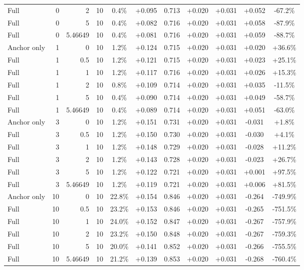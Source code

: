 \begin{table}[htbp]
\begin{tabular}{lrrrccccccc}
Full & 0 & 2 & 10 & 0.4\% & +0.095 & 0.713 & +0.020 & +0.031 & +0.052 & -67.2\% \\
Full & 0 & 5 & 10 & 0.4\% & +0.082 & 0.716 & +0.020 & +0.031 & +0.058 & -87.9\% \\
Full & 0 & 5.46649 & 10 & 0.4\% & +0.081 & 0.716 & +0.020 & +0.031 & +0.059 & -88.7\% \\
Anchor only & 1 & 0 & 10 & 1.2\% & +0.124 & 0.715 & +0.020 & +0.031 & +0.020 & +36.6\% \\
Full & 1 & 0.5 & 10 & 1.2\% & +0.121 & 0.715 & +0.020 & +0.031 & +0.023 & +25.1\% \\
Full & 1 & 1 & 10 & 1.2\% & +0.117 & 0.716 & +0.020 & +0.031 & +0.026 & +15.3\% \\
Full & 1 & 2 & 10 & 0.8\% & +0.109 & 0.714 & +0.020 & +0.031 & +0.035 & -11.5\% \\
Full & 1 & 5 & 10 & 0.4\% & +0.090 & 0.714 & +0.020 & +0.031 & +0.049 & -58.7\% \\
Full & 1 & 5.46649 & 10 & 0.4\% & +0.089 & 0.714 & +0.020 & +0.031 & +0.051 & -63.0\% \\
Anchor only & 3 & 0 & 10 & 1.2\% & +0.151 & 0.731 & +0.020 & +0.031 & -0.031 & +1.8\% \\
Full & 3 & 0.5 & 10 & 1.2\% & +0.150 & 0.730 & +0.020 & +0.031 & -0.030 & +4.1\% \\
Full & 3 & 1 & 10 & 1.2\% & +0.148 & 0.729 & +0.020 & +0.031 & -0.028 & +11.2\% \\
Full & 3 & 2 & 10 & 1.2\% & +0.143 & 0.728 & +0.020 & +0.031 & -0.023 & +26.7\% \\
Full & 3 & 5 & 10 & 1.2\% & +0.122 & 0.721 & +0.020 & +0.031 & +0.001 & +97.5\% \\
Full & 3 & 5.46649 & 10 & 1.2\% & +0.119 & 0.721 & +0.020 & +0.031 & +0.006 & +81.5\% \\
Anchor only & 10 & 0 & 10 & 22.8\% & +0.154 & 0.846 & +0.020 & +0.031 & -0.264 & -749.9\% \\
Full & 10 & 0.5 & 10 & 23.2\% & +0.153 & 0.846 & +0.020 & +0.031 & -0.265 & -751.5\% \\
Full & 10 & 1 & 10 & 24.0\% & +0.152 & 0.847 & +0.020 & +0.031 & -0.267 & -757.9\% \\
Full & 10 & 2 & 10 & 23.2\% & +0.150 & 0.848 & +0.020 & +0.031 & -0.267 & -759.3\% \\
Full & 10 & 5 & 10 & 20.0\% & +0.141 & 0.852 & +0.020 & +0.031 & -0.266 & -755.5\% \\
Full & 10 & 5.46649 & 10 & 21.2\% & +0.139 & 0.853 & +0.020 & +0.031 & -0.268 & -760.4\% \\

\end{tabular}
\end{table}
